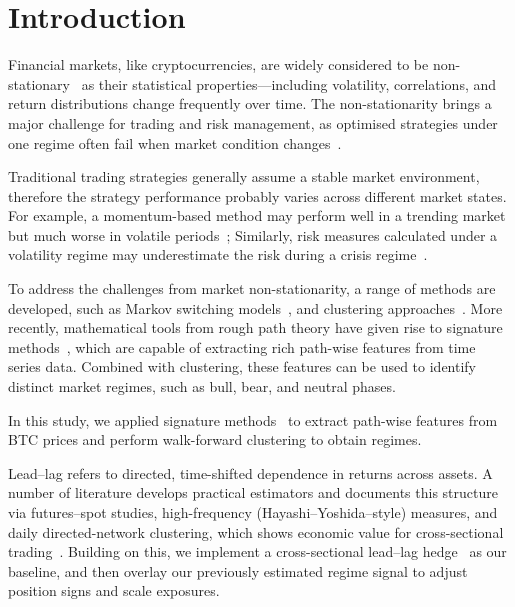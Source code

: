\chapter{Introduction} \label{Chapter:Introduction}


Financial markets, like cryptocurrencies, are widely considered to be non-stationary~\cite{Schmitt_2013,Lo} as their statistical properties—including volatility, correlations, and return distributions change frequently over time.
The non-stationarity brings a major challenge for trading and risk management, as optimised strategies under one regime often fail when market condition changes~\cite{10.1093/rfs/15.4.1137}. 

Traditional trading strategies generally assume a stable market environment, therefore the strategy performance probably varies across different market states. For example, a momentum-based method may perform well in a trending market but much worse in volatile periods~\cite{MOSKOWITZ2012228}; Similarly, risk measures calculated under a volatility regime may underestimate the risk during a crisis regime~\cite{HAMILTON1994307}.

To address the challenges from market non-stationarity, a range of methods are developed, such as Markov switching models~\cite{hamilton1989new}, and clustering approaches~\cite{10.1093/rfs/15.4.1137}. More recently, mathematical tools from rough path theory have given rise to signature methods~\cite{ chevyrev2025primersignaturemethodmachine,issa2023nonparametriconlinemarketregime}, which are capable of extracting rich path-wise features from time series data. Combined with clustering, these features can be used to identify distinct market regimes, such as bull, bear, and neutral phases.

In this study, we applied signature methods~\cite{Lyons1998, chevyrev2025primersignaturemethodmachine,issa2023nonparametriconlinemarketregime} to extract path-wise features from BTC prices and perform walk-forward clustering to obtain regimes.

Lead–lag refers to directed, time-shifted dependence in returns across assets. A number of literature develops practical estimators and documents this structure via futures–spot studies, high-frequency (Hayashi–Yoshida–style) measures, and daily directed-network clustering, which shows economic value for cross-sectional trading~\cite{BROOKS200131,huth2012leadlag,bennett2022leadlag}. Building on this, we implement a cross-sectional lead–lag hedge~\cite{lyons2002system, gatheral2018volatility} as our baseline, and then overlay our previously estimated regime signal to adjust position signs and scale exposures.

